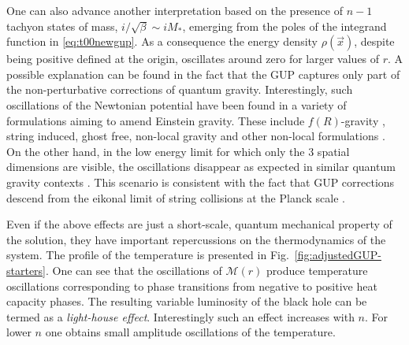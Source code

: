 One can also advance another interpretation based on the presence of $n-1$
tachyon states of mass, $i/\sqrt{\beta}\sim i M_\ast$, emerging from the
poles of the integrand function in \eqref{eq:t00newgup}. As a consequence
the energy density $\rho(\vec{x})$, despite being positive defined at
the origin,  oscillates around zero for larger values of $r$. 
A possible explanation  can be found in the fact that the GUP captures
only part of the non-perturbative corrections of quantum gravity. 
Interestingly, such oscillations of the Newtonian potential have been
found in a variety of formulations aiming to amend Einstein gravity.
These include $f(R)$-gravity \cite{NoO2003,Olmo2005,Faraoni96,CST2007,NoO2007,CENOSZ2008,CDLF2010,BeG2011,Schell2016},
string induced, ghost free, non-local gravity \cite{EKMaz2016,FroZ2016}
and other non-local formulations \cite{KeMa2014}.   
On the other hand, in the low energy limit for which only the $3$ spatial
dimensions are visible, the oscillations disappear as expected in similar
quantum gravity contexts \cite{HaH02,Perivo16}.
This scenario is consistent with the  fact that GUP corrections descend
from the  eikonal limit of string collisions at the Planck
scale \cite{ACV89,ACV93,ACV87,ACV88,ACV90,GrM88,GrM87}.

Even if the above effects are just a short-scale, quantum mechanical
property of the solution, they have important repercussions on the
thermodynamics of the system. The profile of the  temperature  is
presented in Fig.~\ref{fig:adjustedGUP-starters}. One can see that the
oscillations of $\mathcal{M}(r)$  produce temperature oscillations
corresponding to phase transitions from negative to positive heat
capacity phases. The resulting variable luminosity of the black hole
can be termed as a \textit{light-house effect}. Interestingly such an
effect increases with $n$. For lower $n$  one obtains small amplitude
oscillations of the temperature. 

